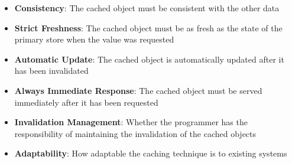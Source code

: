 \begin{itemize}
  \item \textbf{Consistency}: The cached object must be consistent with the other data
  \item \textbf{Strict Freshness}: The cached object must be as fresh as the state of the primary store when the value was requested
  \item \textbf{Automatic Update}: The cached object is automatically updated after it has been invalidated
  \item \textbf{Always Immediate Response}: The cached object must be served immediately after it has been requested
  \item \textbf{Invalidation Management}: Whether the programmer has the responsibility of maintaining the invalidation of the cached objects
  \item \textbf{Adaptability}: How adaptable the caching technique is to existing systems
\end{itemize}



